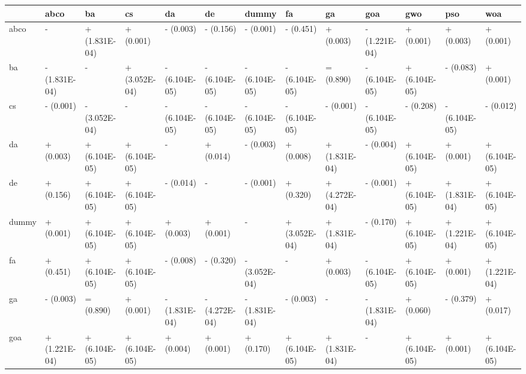 \begin{table}
    \centering
    \begin{adjustbox}{width=\linewidth}
        \begin{tabular}{lllllllllllll}
            \toprule
            {}    & abco          & ba            & cs            & da            & de            & dummy         & fa            & ga            & goa           & gwo           & pso           & woa           \\
            \midrule
            abco  & -             & + (1.831E-04) & + (0.001)     & - (0.003)     & - (0.156)     & - (0.001)     & - (0.451)     & + (0.003)     & - (1.221E-04) & + (0.001)     & + (0.003)     & + (0.001)     \\
            ba    & - (1.831E-04) & -             & + (3.052E-04) & - (6.104E-05) & - (6.104E-05) & - (6.104E-05) & - (6.104E-05) & = (0.890)     & - (6.104E-05) & + (6.104E-05) & - (0.083)     & + (0.001)     \\
            cs    & - (0.001)     & - (3.052E-04) & -             & - (6.104E-05) & - (6.104E-05) & - (6.104E-05) & - (6.104E-05) & - (0.001)     & - (6.104E-05) & - (0.208)     & - (6.104E-05) & - (0.012)     \\
            da    & + (0.003)     & + (6.104E-05) & + (6.104E-05) & -             & + (0.014)     & - (0.003)     & + (0.008)     & + (1.831E-04) & - (0.004)     & + (6.104E-05) & + (0.001)     & + (6.104E-05) \\
            de    & + (0.156)     & + (6.104E-05) & + (6.104E-05) & - (0.014)     & -             & - (0.001)     & + (0.320)     & + (4.272E-04) & - (0.001)     & + (6.104E-05) & + (1.831E-04) & + (6.104E-05) \\
            dummy & + (0.001)     & + (6.104E-05) & + (6.104E-05) & + (0.003)     & + (0.001)     & -             & + (3.052E-04) & + (1.831E-04) & - (0.170)     & + (6.104E-05) & + (1.221E-04) & + (6.104E-05) \\
            fa    & + (0.451)     & + (6.104E-05) & + (6.104E-05) & - (0.008)     & - (0.320)     & - (3.052E-04) & -             & + (0.003)     & - (6.104E-05) & + (6.104E-05) & + (0.001)     & + (1.221E-04) \\
            ga    & - (0.003)     & = (0.890)     & + (0.001)     & - (1.831E-04) & - (4.272E-04) & - (1.831E-04) & - (0.003)     & -             & - (1.831E-04) & + (0.060)     & - (0.379)     & + (0.017)     \\
            goa   & + (1.221E-04) & + (6.104E-05) & + (6.104E-05) & + (0.004)     & + (0.001)     & + (0.170)     & + (6.104E-05) & + (1.831E-04) & -             & + (6.104E-05) & + (0.001)     & + (6.104E-05) \\

\end{tabular}
\end{adjustbox}
\end{table}
